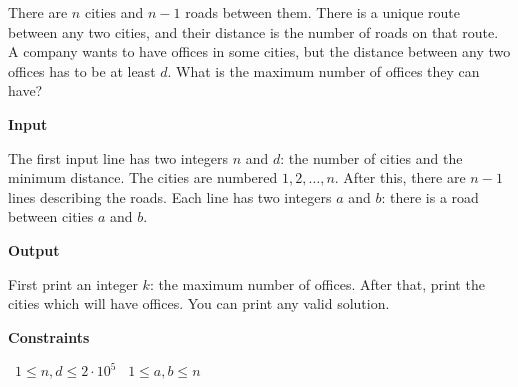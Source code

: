 There are $n$ cities and $n-1$ roads between them. There is a unique route between any two cities, and their distance is the number of roads on that route.
A company wants to have offices in some cities, but the distance between any two offices has to be at least $d$. What is the maximum number of offices they can have?

\vspace{0.3cm}\noindent\textbf{Input}

The first input line has two integers $n$ and $d$: the number of cities and the minimum distance. The cities are numbered $1,2,\dots,n$.
After this, there are $n-1$ lines describing the roads. Each line has two integers $a$ and $b$: there is a road between cities $a$ and $b$.

\vspace{0.3cm}\noindent\textbf{Output}

First print an integer $k$: the maximum number of offices. After that, print the cities which will have offices. You can print any valid solution.

\vspace{0.3cm}\noindent\textbf{Constraints}

\textbullet\ $1 \le n,d \le 2 \cdot 10^5$
\textbullet\ $1 \le a,b \le n$